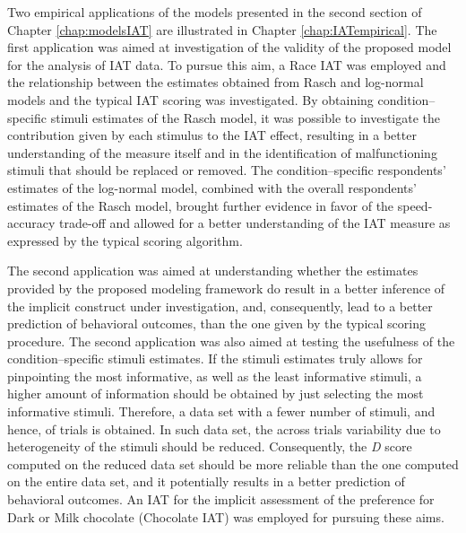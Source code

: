 \documentclass[12pt]{book}
\begin{document}
Two empirical applications of the models presented in the second section of Chapter \ref{chap:modelsIAT} are illustrated in Chapter \ref{chap:IATempirical}.
The first application was aimed at investigation of the validity of the proposed model for the analysis of IAT data. To pursue this aim, a Race IAT was employed and the relationship between the estimates obtained from Rasch and log-normal models and the typical IAT scoring was investigated. By obtaining condition--specific stimuli estimates of the Rasch model, it was possible to investigate the contribution given by each stimulus to the IAT effect, resulting in a better understanding of the measure itself and in the identification of malfunctioning stimuli that should be replaced or removed. The condition--specific respondents' estimates of the log-normal model, combined with the overall respondents' estimates of the Rasch model, brought further evidence in favor of the speed-accuracy trade-off and allowed for a better understanding of the IAT measure as expressed by the typical scoring algorithm. 

The second application was aimed at understanding whether the estimates provided by the proposed modeling framework do result in a better inference of the implicit construct under investigation, and, consequently, lead to a better prediction of behavioral outcomes, than the one given by the typical scoring procedure. 
The second application was also aimed at testing the usefulness of the condition--specific stimuli estimates. If the stimuli estimates truly allows for pinpointing the most informative, as well as the least informative stimuli, a higher amount of information should be obtained by just selecting the most informative stimuli. Therefore, a data set with a fewer number of stimuli, and hence, of trials is obtained. In such data set, the across trials variability due to heterogeneity of the stimuli should be reduced. 
Consequently, the \emph{D} score computed on the reduced data set should be more reliable than the one computed on the entire data set, and it potentially results in a better prediction of behavioral outcomes. 
An IAT for the implicit assessment of the preference for Dark or Milk chocolate (Chocolate IAT) was employed for pursuing these aims. 
\end{document}
